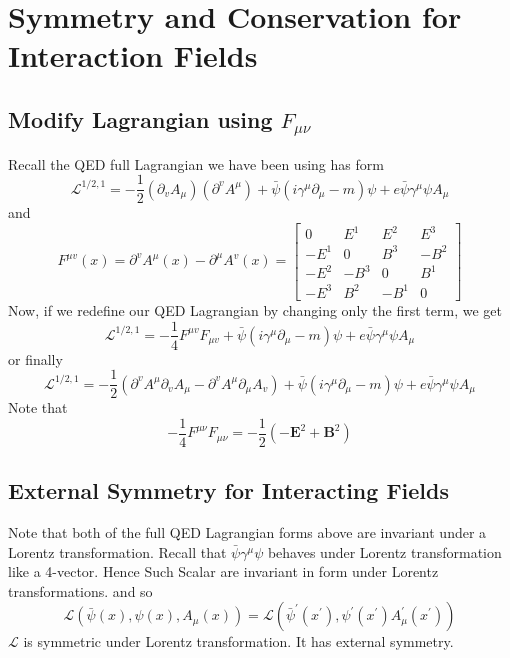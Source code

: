 \chapter{Symmetry and Conservation for Interaction Fields}
\section{Modify Lagrangian using \texorpdfstring{$F_{\mu\nu}$}{TEXT}}
Recall the QED full Lagrangian we have been using has form
\begin{equation}
\mathcal{L}^{1 / 2,1}=-\frac{1}{2}\left(\partial_{v} A_{\mu}\right)\left(\partial^{v} A^{\mu}\right)+\bar{\psi}\left(i \gamma^{\mu} \partial_{\mu}-m\right) \psi+e \bar{\psi} \gamma^{\mu} \psi A_{\mu}
\end{equation}
and
$$
F^{\mu v}(x)=\partial^{v} A^{\mu}(x)-\partial^{\mu} A^{v}(x)=\left[\begin{array}{cccc}
0 & E^{1} & E^{2} & E^{3} \\
-E^{1} & 0 & B^{3} & -B^{2} \\
-E^{2} & -B^{3} & 0 & B^{1} \\
-E^{3} & B^{2} & -B^{1} & 0
\end{array}\right]
$$
Now, if we redefine our QED Lagrangian by changing only the first term, we get
\begin{equation}
\mathcal{L}^{1 / 2,1}=-\frac{1}{4} F^{\mu v} F_{\mu v}+\bar{\psi}\left(i \gamma^{\mu} \partial_{\mu}-m\right) \psi+e \bar{\psi} \gamma^{\mu} \psi A_{\mu}
\label{redefine-qed-lagrangian}
\end{equation}
or finally
$$
\mathcal{L}^{1 / 2,1}=-\frac{1}{2}\left(\partial^{v} A^{\mu} \partial_{v} A_{\mu}-\partial^{v} A^{\mu} \partial_{\mu} A_{v}\right)+\bar{\psi}\left(i \gamma^{\mu} \partial_{\mu}-m\right) \psi+e \bar{\psi} \gamma^{\mu} \psi A_{\mu}
$$
Note that
\begin{equation}
-\frac{1}{4} F^{\mu \nu} F_{\mu \nu}=-\frac{1}{2}\left(-\mathbf{E}^{2}+\mathbf{B}^{2}\right)
\end{equation}

\section{External Symmetry for Interacting Fields}
Note that both of the full QED Lagrangian forms above are invariant under a Lorentz transformation. Recall that $\bar{\psi}\gamma^{\mu}\psi$ behaves under Lorentz transformation like a 4-vector. Hence  Such Scalar are invariant in form under Lorentz transformations. and so 
\begin{equation}
\mathcal{L}\left(\bar{\psi}(x), \psi(x), A_{\mu}(x)\right)=\mathcal{L}\left(\bar{\psi}^{\prime}\left(x^{\prime}\right), \psi^{\prime}\left(x^{\prime}\right) A_{\mu}^{\prime}\left(x^{\prime}\right)\right)
\end{equation}
$\mathcal{L}$ is symmetric under Lorentz transformation. It has external symmetry.
